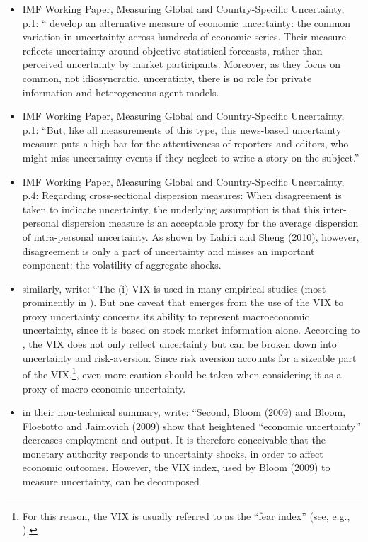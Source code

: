 \documentclass[a4paper,11pt,listof=nochaptergap,oneside,pointednumbers,bibtotoc,bigheadings,liststotoc]{scrbook}
\begin{document}
\begin{itemize}
	\item IMF Working Paper, Measuring Global and Country-Specific Uncertainty, p.1: ``\citet{juradoetal:15} develop an alternative measure of economic uncertainty: the common variation in uncertainty across hundreds of economic series. Their measure reflects uncertainty around objective statistical forecasts, rather than perceived uncertainty by market participants. Moreover, as they focus on common, not idiosyncratic, unceratinty, there is no role for private information and heterogeneous agent models.
	\item IMF Working Paper, Measuring Global and Country-Specific Uncertainty, p.1: ``But, like all measurements of this type, this news-based uncertainty measure puts a high bar for the attentiveness of reporters and editors, who might miss uncertainty events if they neglect to write a story on the subject.'' 
	\item IMF Working Paper, Measuring Global and Country-Specific Uncertainty, p.4: Regarding cross-sectional dispersion measures: When disagreement is taken to indicate uncertainty, the underlying assumption is that this inter-personal dispersion measure is an acceptable proxy for the average dispersion of intra-personal uncertainty. As shown by Lahiri and Sheng (2010), however, disagreement is only a part of uncertainty and misses an important component: the volatility of aggregate shocks.
		\item similarly, \citet[p. 12]{bontempietal:16} write: ``The (i) VIX is used in many empirical studies (most prominently in \citet{bloom:09}). But one caveat that emerges from the use of the VIX to proxy uncertainty concerns its ability to represent macroeconomic uncertainty, since it is based on stock market information alone. According to \citet{bekaertetal:13}, the VIX does not only reflect uncertainty but can be broken down into uncertainty and risk-aversion. Since risk aversion accounts for a sizeable part of the VIX,\footnote{For this reason, the VIX is usually referred to as the ``fear index'' (see, e.g., \citet{whaley:00}).}, even more caution should be taken when considering it as a proxy of macro-economic uncertainty.
	\item in their non-technical summary, \citet{bekaertetal:13} write: ``Second, Bloom (2009) and Bloom, Floetotto and Jaimovich (2009) show that heightened
“economic uncertainty” decreases employment and output. It is therefore conceivable that the
monetary authority responds to uncertainty shocks, in order to affect economic outcomes.
However, the VIX index, used by Bloom (2009) to measure uncertainty, can be decomposed

\end{itemize}
\end{document}
